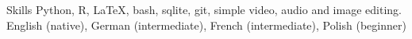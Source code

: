 
\begin{rubric}{Skills}
	Python, R, \LaTeX, bash, {\sc sqlite}, git, simple video, audio and image editing.
    English (native), German (intermediate), French (intermediate), Polish (beginner)
\end{rubric}
